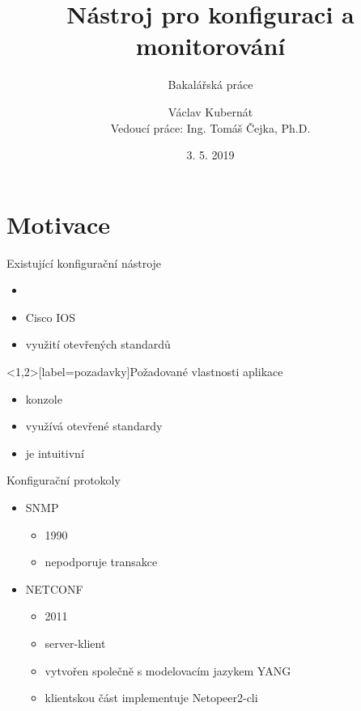 \documentclass[czech,aspectratio=169]{beamer}
\title[Nástroj pro konfiguraci a monitorování]{Nástroj pro konfiguraci a monitorování}
\subtitle{Bakalářská práce}
\institute[FIT ČVUT v Praze]{Fakulta informačních technologií \\ České vysoké učení technické v Praze}
\author[V. Kubernát]{Václav Kubernát \\ Vedoucí práce: Ing. Tomáš Čejka, Ph.D.}
\date{3. 5. 2019}
\begin{document}
\begin{frame}
    \titlepage{} %
\end{frame}

\begin{frame}
    \tableofcontents
\end{frame}

\section{Motivace}
\begin{frame}
\tableofcontents[currentsection]
\end{frame}
\begin{frame}{Existující konfigurační nástroje}
\begin{itemize}
\pause{}
\item{} \pause{}
 \pause{}
\item Cisco IOS \pause{}
\item využití otevřených standardů
\end{itemize}
\end{frame}

  \begin{frame}<1,2>[label=pozadavky]{Požadované vlastnosti aplikace}
      \begin{itemize}[<+>]
          \item konzole
          \item využívá otevřené standardy
          \item je intuitivní
      \end{itemize}
  \end{frame}

\begin{frame}{Konfigurační protokoly}
    \begin{itemize}
        \pause{}
        \item[] SNMP
            \begin{itemize}
                \item 1990
                \item nepodporuje transakce
            \end{itemize}
            \pause{}
        \item[] NETCONF
            \begin{itemize}
                \item 2011
                \item server-klient
                \item vytvořen společně s modelovacím jazykem YANG
                \pause{}
                \item klientskou část implementuje Netopeer2-cli
            \end{itemize}
    \end{itemize}
\end{frame}
\end{document}
